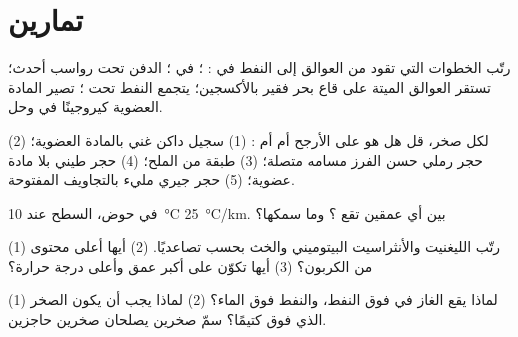 \section{تمارين}

\begin{exercise}[$\star$]\label{exo:g11:fossil-fuel-geology:1}
رتّب الخطوات التي تقود من العوالق إلى النفط في : ؛
 في ؛ الدفن تحت رواسب أحدث؛ تستقر العوالق الميتة
على قاع بحر فقير بالأكسجين؛ يتجمع النفط تحت ؛ تصير المادة
العضوية كيروجينًا في وحل.
\end{exercise}

\begin{exercise}[$\star$]\label{exo:g11:fossil-fuel-geology:2}
لكل صخر، قل هل هو على الأرجح  أم 
أم : (1) سجيل داكن غني بالمادة العضوية؛ (2) حجر رملي حسن
الفرز مسامه متصلة؛ (3) طبقة من الملح؛ (4) حجر طيني بلا
مادة عضوية؛ (5) حجر جيري مليء بالتجاويف المفتوحة.
\end{exercise}

\begin{exercise}[$\star$]\label{exo:g11:fossil-fuel-geology:3}
في حوض، السطح عند \qty{10}{\degreeCelsius}  \qty{25}{\degreeCelsius/km}. بين أي عمقين تقع ؟ وما سمكها؟
\end{exercise}

\begin{exercise}[$\star$]\label{exo:g11:fossil-fuel-geology:4}
(1) رتّب الليغنيت والأنثراسيت  البيتوميني والخث بحسب 
تصاعديًا. (2) أيها أعلى محتوى من الكربون؟ (3) أيها تكوّن على
أكبر عمق وأعلى درجة حرارة؟
\end{exercise}

\begin{exercise}[$\star$]\label{exo:g11:fossil-fuel-geology:5}
(1) لماذا يقع الغاز في  فوق النفط، والنفط فوق الماء؟ (2) لماذا
يجب أن يكون الصخر الذي فوق  كتيمًا؟ سمّ صخرين يصلحان
صخرين حاجزين.
\end{exercise}


